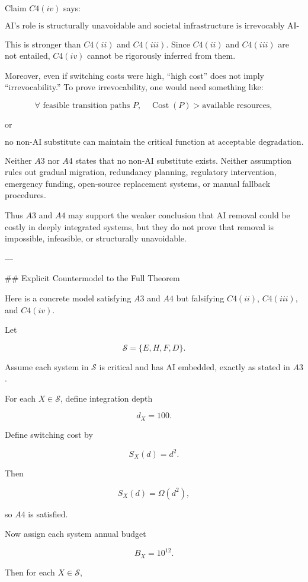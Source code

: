 Claim \(C4(iv)\) says:

\[
\text{AI's role is structurally unavoidable and societal infrastructure is irrevocably AI-dependent.}
\]

This is stronger than \(C4(ii)\) and \(C4(iii)\). Since \(C4(ii)\) and \(C4(iii)\) are not entailed, \(C4(iv)\) cannot be rigorously inferred from them.

Moreover, even if switching costs were high, “high cost” does not imply “irrevocability.” To prove irrevocability, one would need something like:

\[
\forall \text{ feasible transition paths } P,\quad \operatorname{Cost}(P) > \text{available resources},
\]

or

\[
\text{no non-AI substitute can maintain the critical function at acceptable degradation}.
\]

Neither \(A3\) nor \(A4\) states that no non-AI substitute exists. Neither assumption rules out gradual migration, redundancy planning, regulatory intervention, emergency funding, open-source replacement systems, or manual fallback procedures.

Thus \(A3\) and \(A4\) may support the weaker conclusion that AI removal could be costly in deeply integrated systems, but they do not prove that removal is impossible, infeasible, or structurally unavoidable.

---

## Explicit Countermodel to the Full Theorem

Here is a concrete model satisfying \(A3\) and \(A4\) but falsifying \(C4(ii)\), \(C4(iii)\), and \(C4(iv)\).

Let

\[
\mathcal{S}=\{E,H,F,D\}.
\]

Assume each system in \(\mathcal{S}\) is critical and has AI embedded, exactly as stated in \(A3\).

For each \(X \in \mathcal{S}\), define integration depth

\[
d_X=100.
\]

Define switching cost by

\[
S_X(d)=d^2.
\]

Then

\[
S_X(d)=\Omega(d^2),
\]

so \(A4\) is satisfied.

Now assign each system annual budget

\[
B_X=10^{12}.
\]

Then for each \(X \in \mathcal{S}\),

